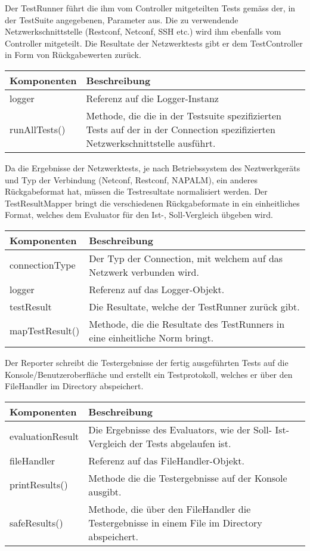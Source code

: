 \documentclass[]{subfiles}
\begin{document}
	Der TestRunner führt die ihm vom Controller mitgeteilten Tests gemäss der, in der TestSuite angegebenen, Parameter aus. 
	Die zu verwendende Netzwerkschnittstelle (Restconf, Netconf, SSH etc.) wird ihm ebenfalls vom Controller mitgeteilt.
	Die Resultate der Netzwerktests gibt er dem TestController in Form von Rückgabewerten zurück.

	\begin{tabularx}{\textwidth}{lX}
		\toprule
			Komponenten & Beschreibung \\
		\midrule
			logger & Referenz auf die Logger-Instanz \\ 
		\midrule
			runAllTests() & Methode, die die in der Testsuite spezifizierten Tests auf der in der Connection spezifizierten Netzwerkschnittstelle ausführt. \\
		\bottomrule
	\end{tabularx}
	\newpage

	Da die Ergebnisse der Netzwerktests, je nach Betriebssystem des Neztwerkgeräts und Typ der Verbindung (Netconf, Restconf, NAPALM), ein anderes Rückgabeformat hat, müssen die Testresultate normalisiert werden.
	Der TestResultMapper bringt die verschiedenen Rückgabeformate in ein einheitliches Format, welches dem Evaluator für den Ist-, Soll-Vergleich übgeben wird.

	\begin{tabularx}{\textwidth}{lX}
		\toprule
			Komponenten & Beschreibung \\
		\midrule
			connectionType & Der Typ der Connection, mit welchem auf das Netzwerk verbunden wird. \\
			logger & Referenz auf das Logger-Objekt. \\	
			testResult & Die Resultate, welche der TestRunner zurück gibt. \\
		\midrule
			mapTestResult() & Methode, die die Resultate des TestRunners in eine einheitliche Norm bringt. \\
		\bottomrule
	\end{tabularx}

	Der Reporter schreibt die Testergebnisse der fertig ausgeführten Tests auf die Konsole/Benutzeroberfläche und erstellt ein Testprotokoll, welches er über den FileHandler im Directory abspeichert.

	\begin{tabularx}{\textwidth}{lX}
		\toprule
			Komponenten & Beschreibung \\
		\midrule
			evaluationResult & Die Ergebnisse des Evaluators, wie der Soll- Ist-Vergleich der Tests abgelaufen ist. \\
			fileHandler & Referenz auf das FileHandler-Objekt. \\	
		\midrule
			printResults() & Methode die die Testergebnisse auf der Konsole ausgibt. \\
			safeResults() & Methode, die über den FileHandler die Testergebnisse in einem File im Directory abspeichert. \\
		\bottomrule
	\end{tabularx}
\end{document}
